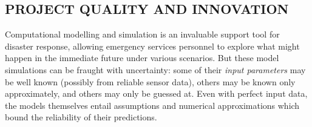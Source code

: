 \subsection*{PROJECT QUALITY AND INNOVATION}


Computational modelling and simulation is an invaluable support tool
for disaster response, allowing emergency services personnel to
explore what might happen in the immediate future under various
scenarios. But these model simulations can be fraught with
uncertainty: some of their \emph{input parameters} may be well known
(possibly from reliable sensor data), others may be known only
approximately, and others may only be guessed at. Even with
perfect input data, the models themselves entail assumptions and
numerical approximations which bound the reliability of their
predictions.

